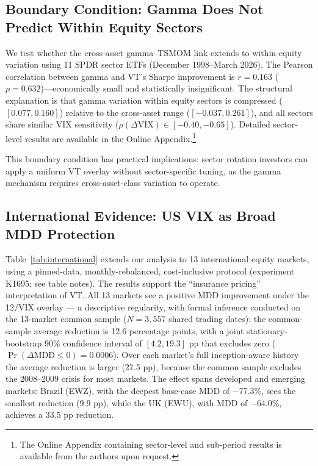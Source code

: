 \subsection{Boundary Condition: Gamma Does Not Predict Within Equity Sectors}

We test whether the cross-asset gamma--TSMOM link extends to within-equity variation using 11 SPDR sector ETFs (December 1998--March 2026). The Pearson correlation between gamma and VT's Sharpe improvement is $r = 0.163$ ($p = 0.632$)---economically small and statistically insignificant. The structural explanation is that gamma variation within equity sectors is compressed ($[0.077, 0.160]$) relative to the cross-asset range ($[-0.037, 0.261]$), and all sectors share similar VIX sensitivity ($\rho(\Delta\text{VIX}) \in [-0.40, -0.65]$). Detailed sector-level results are available in the Online Appendix.\footnote{The Online Appendix containing sector-level and sub-period results is available from the authors upon request.}

This boundary condition has practical implications: sector rotation investors can apply a uniform VT overlay without sector-specific tuning, as the gamma mechanism requires cross-asset-class variation to operate.


\subsection{International Evidence: US VIX as Broad MDD Protection}

Table~\ref{tab:international} extends our analysis to 13 international equity markets, using a pinned-data, monthly-rebalanced, cost-inclusive protocol (experiment K1695; see table notes). The results support the ``insurance pricing'' interpretation of VT. All 13 markets see a positive MDD improvement under the 12/VIX overlay --- a descriptive regularity, with formal inference conducted on the 13-market common sample ($N = 3{,}557$ shared trading dates): the common-sample average reduction is 12.6 percentage points, with a joint stationary-bootstrap 90\% confidence interval of $[4.2, 19.3]$ pp that excludes zero ($\Pr(\Delta\text{MDD} \le 0) = 0.0006$). Over each market's full inception-aware history the average reduction is larger (27.5 pp), because the common sample excludes the 2008--2009 crisis for most markets. The effect spans developed and emerging markets: Brazil (EWZ), with the deepest base-case MDD of $-$77.3\%, sees the smallest reduction (9.9 pp), while the UK (EWU), with MDD of $-$64.0\%, achieves a 33.5 pp reduction.

